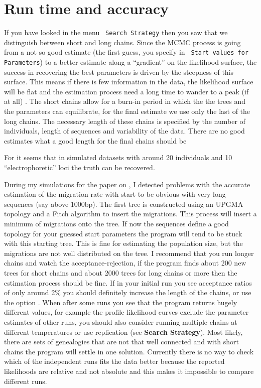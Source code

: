 \section{Run time and accuracy}
If you have looked in the menu \texttt{ Search Strategy} then you saw that
we distinguish between short and long chains. Since the MCMC process
is going from a not so good estimate (the first guess, you specify in
\texttt{ Start values for Parameters}) to a better estimate along a
``gradient'' on the likelihood surface, the success in recovering the
best parameters is driven by the steepness of this surface. This means
if there is few information in the data, the likelihood surface will
be flat and the estimation process need a long time to wander to a
peak (if at all) . The short chains allow for a burn-in period in
which the the trees and the parameters can equilibrate, for the final
estimate we use only the last of the long chains. The necessary length
of these chains is specified by the number of individuals, length of
sequences and variability of the data. There are no good estimates
what a good length for the final chains should be
\par
For {\migrate} it seems that in simulated datasets with around 20
individuals and 10 ``electrophoretic'' loci the truth can be
recovered.
\par
During my simulations for the paper on \migrate \citep{beerli:1999:MLE}, I detected problems 
with the accurate estimation of the migration rate with
start to be obvious with very long sequences (say above 1000bp). 
The first tree is constructed using an UPGMA topology and a Fitch algorithm to 
insert the migrations. This process will insert a minimum of migrations 
onto the tree.
If now the sequences define a good topology for your guessed start 
parameters the program will tend to be stuck with this starting tree.  This is
fine for estimating the population size, but the migrations are not 
well distributed on the tree. 
I recommend that you run longer chains and watch the 
acceptance-rejection, if the program finds about 200 new trees for short chains and about 2000 trees for long chains or more  then the estimation process should be fine.
If in your initial run you see acceptance ratios of only around 2\% you should 
definitely increase the length of the chains, or use the option {}. 
When after some runs
you see that the program returns hugely different values, for example
the profile likelihood curves exclude the parameter estimates of other
runs, you should also consider running multiple chains 
at different temperatures or use replication (see \textbf{ Search Strategy}).
Most likely, there are
sets of genealogies that are not that well connected and with short
chains the program will settle in one solution. 
Currently there is no way to check
which of the independent runs fits the data better because the 
reported likelihoods are relative and not absolute and this makes 
it impossible to compare different runs. 

